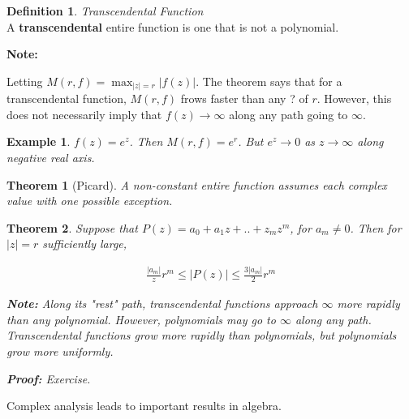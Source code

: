 \documentclass{article}
\newtheorem{theorem}{Theorem}[section]
\newtheorem{ex}{Example}
\theoremstyle{definition}
\newtheorem{definition}{Definition}[section]
\newcommand{\Def}[2]{
\begin{shaded*}
\begin{definition}{\textit{#1}}\\#2\end{definition}
\end{shaded*}
}
\begin{document}
\Def{Transcendental Function}{A \textbf{transcendental} entire function is one that is not a polynomial. }

\textbf{Note:}

Letting $M(r,f) = \max_{|z|=r} |f(z)|$. The theorem says that for a transcendental function, $M(r,f)$ frows faster than any ? of $r$. However, this does not necessarily imply that $f(z) \to \infty$ along any path going to $\infty$. 

\begin{ex}
$f(z) = e^z$. Then $M(r,f) = e^r$. But $e^z \to 0$ as $z \to \infty$ along negative real axis. 
\end{ex}

\begin{theorem}[Picard]
A non-constant entire function assumes each complex value with one possible exception.
\end{theorem}

\begin{theorem}
Suppose that $P(z) = a_0 + a_1 z + .. + z_m z^m$, for $a_m \neq 0$. Then for $|z| = r$ sufficiently large, 

\begin{align}
\frac{|a_m|}{z} r^m \leq |P(z)| \leq \frac{3 |a_m|}{2} r^m
\end{align}

\textbf{Note:}
Along its "rest" path, transcendental functions approach $\infty$ more rapidly than any polynomial. However, polynomials may go to $\infty$ along any path. Transcendental functions grow more rapidly than polynomials, but polynomials grow more uniformly. 

\textbf{Proof:} Exercise.
\end{theorem}

Complex analysis leads to important results in algebra. 
\end{document}
